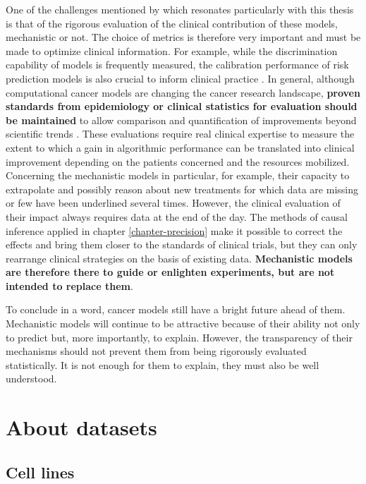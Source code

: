 \documentclass[a4paper,12pt,twoside,onecolumn,openright,final,oldfontcommands]{memoir}
\begin{document}
One of the challenges mentioned by \citet{wiens2019no} which resonates
particularly with this thesis is that of the rigorous evaluation of the
clinical contribution of these models, mechanistic or not. The choice of
metrics is therefore very important and must be made to optimize
clinical information. For example, while the discrimination capability
of models is frequently measured, the calibration performance of risk
prediction models is also crucial to inform clinical practice
\citep{van2019calibration}. In general, although computational cancer
models are changing the cancer research landscape, \textbf{proven
standards from epidemiology or clinical statistics for evaluation should
be maintained} to allow comparison and quantification of improvements
beyond scientific trends \citep{christodoulou2019systematic}. These
evaluations require real clinical expertise to measure the extent to
which a gain in algorithmic performance can be translated into clinical
improvement depending on the patients concerned and the resources
mobilized. Concerning the mechanistic models in particular, for example,
their capacity to extrapolate and possibly reason about new treatments
for which data are missing or few have been underlined several times.
However, the clinical evaluation of their impact always requires data at
the end of the day. The methods of causal inference applied in chapter
\ref{chapter-precision} make it possible to correct the effects and
bring them closer to the standards of clinical trials, but they can only
rearrange clinical strategies on the basis of existing data.
\textbf{Mechanistic models are therefore there to guide or enlighten
experiments, but are not intended to replace them}.

To conclude in a word, cancer models still have a bright future ahead of
them. Mechanistic models will continue to be attractive because of their
ability not only to predict but, more importantly, to explain. However,
the transparency of their mechanisms should not prevent them from being
rigorously evaluated statistically. It is not enough for them to
explain, they must also be well understood.

\appendix {}


\chapter{About datasets}\label{appendix-datasets}

\section{Cell lines}\label{appendix-cl}
\end{document}
